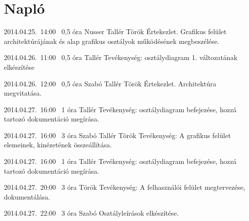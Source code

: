 %
\section{Napló}

\begin{naplo}

\bejegyzes
{2014.04.25.~14:00~}
{0,5 óra}
{Nusser\newline
Tallér\newline
Török}
{Értekezlet. Grafikus felület architektúrájának és alap grafikus osztályok működésének megbeszélése.}

\bejegyzes
{2014.04.26.~11:00~}
{0,5 óra}
{Tallér}
{Tevékenység: osztálydiagram 1. változatának elkészítése}

\bejegyzes
{2014.04.26.~12:00~}
{0,5 óra}
{Szabó\newline
Tallér\newline
Török}
{Értekezlet. Architektúra megvitatása.}

\bejegyzes
{2014.04.27.~16:00~}
{1 óra}
{Tallér}
{Tevékenység: osztálydiagram befejezése, hozzá tartozó dokumentáció megírása.}

\bejegyzes
{2014.04.27.~16:00~}
{3 óra}
{Szabó\newline
Tallér\newline
Török\newline}
{Tevékenység: A grafikus felület elemeinek, kinézetének összeállítása.}

\bejegyzes
{2014.04.27.~16:00~}
{1 óra}
{Tallér}
{Tevékenység: osztálydiagram befejezése, hozzá tartozó dokumentáció megírása.}

\bejegyzes
{2014.04.27.~20:00~}
{3 óra}
{Török}
{Tevékenység: A felhasználói felület megtervezése, dokumentálása.}

\bejegyzes
{2014.04.27.~22:00~} %
{3 óra} %
{Szabó} %
{Osztályleírások elkészítése.} %

\end{naplo}
